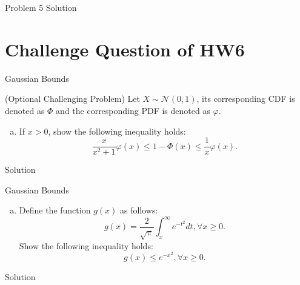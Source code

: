 \documentclass{beamer}
\begin{document}
\begin{frame}{Problem 5 Solution}
	
\end{frame}

\section{Challenge Question of HW6}

\begin{frame}{Gaussian Bounds}

(Optional Challenging Problem) Let $X \sim \mathcal{N}(0,1)$, its corresponding CDF is denoted as $\Phi$ and the corresponding PDF is denoted as $\varphi$.
\begin{enumerate}[(a)]
\item If $x>0$, show the following inequality holds:
\begin{equation*}
	\frac{x}{x^2+1} \varphi(x) \leq 1-\Phi(x) \leq \frac{1}{x} \varphi(x).
\end{equation*}
\end{enumerate}

\end{frame}

\begin{frame}{Solution}
	
\end{frame}

\begin{frame}{Gaussian Bounds}

\begin{enumerate}[(b)]
\item Define the function $g(x)$ as follows:
\begin{equation*}
	g(x)=\frac{2}{\sqrt{\pi}} \int_x^{\infty} e^{-t^2} d t, \forall x \geq 0 .	
\end{equation*}
Show the following inequality holds:
\begin{equation*}
	g(x) \leq e^{-x^2}, \forall x \geq 0 .	
\end{equation*}
\end{enumerate}

\end{frame}

\begin{frame}{Solution}
	
\end{frame}
\end{document}
